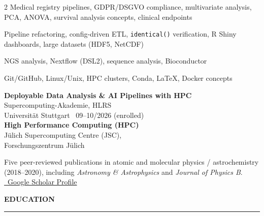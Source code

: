\documentclass{thejus_cv}
\begin{document}
\begin{paracol}{2}
         {Medical registry pipelines, GDPR/DSGVO compliance, multivariate analysis, PCA, ANOVA, survival analysis concepts, clinical endpoints}

         {Pipeline refactoring, config-driven ETL, \texttt{identical()} verification, R Shiny dashboards, large datasets (HDF5, NetCDF)}

         {NGS analysis, Nextflow (DSL2), sequence analysis, Bioconductor}

         {Git/GitHub, Linux/Unix, HPC clusters, Conda, LaTeX, Docker concepts}





\textbf{Deployable Data Analysis \& AI Pipelines with HPC}\\
{\small Supercomputing-Akademie, HLRS\\
Universit\"at Stuttgart \textbar\ 09--10/2026 (enrolled)}\\[0.3cm]

\textbf{High Performance Computing (HPC)}\\
{\small J\"ulich Supercomputing Centre (JSC),\\
Forschungszentrum J\"ulich}\\[0.4cm]


{\small
Five peer-reviewed publications in atomic and molecular physics / astrochemistry (2018--2020), including \textit{Astronomy \& Astrophysics} and \textit{Journal of Physics B}.
}\\[0.3cm]
\href{https://scholar.google.com/citations?user=PJkZwAwAAAAJ}{\faGraduationCap\ Google Scholar Profile}

\end{paracol}

\begin{center}
    \vspace{0.1em}
    {\Large\textbf{EDUCATION}}\\
    {\color{cvtext}\rule{0.5\linewidth}{1.5pt}}\par
    \vspace{0.3em}
\end{center}
\end{document}
